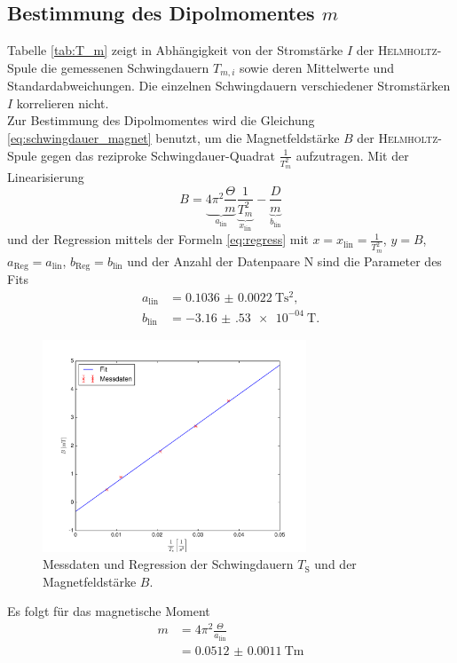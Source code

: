 \subsection{Bestimmung des Dipolmomentes \texorpdfstring{$m$}{m}}
\label{sec:auswertung2}
Tabelle \ref{tab:T_m} zeigt in Abhängigkeit von der Stromstärke $I$ der \textsc{Helmholtz}-Spule die gemessenen Schwingdauern $T_{m,i}$ sowie deren Mittelwerte und Standardabweichungen. 
Die einzelnen Schwingdauern verschiedener Stromstärken $I$ korrelieren nicht.\\

Zur Bestimmung des Dipolmomentes wird die Gleichung \eqref{eq:schwingdauer_magnet} benutzt, um die Magnetfeldstärke $B$ 
der \textsc{Helmholtz}-Spule gegen das reziproke Schwingdauer-Quadrat $\frac{1}{T_{m}^2}$ aufzutragen.
Mit der Linearisierung
\begin{equation}
	B = \underbrace{4\pi^2\frac{\Theta}{m}}_{a_\text{lin}} \underbrace{\frac{1}{T_m^2}}_{x_\text{lin}} - \underbrace{\frac{D}{m}}_{b_\text{lin}}
	\label{eq:B_lin}
\end{equation}
und der Regression mittels der Formeln \eqref{eq:regress}
mit $x=x_\text{lin}=\frac{1}{T_m^2}$, $y=B$, $a_\text{Reg}=a_\text{lin}$, $b_\text{Reg}=b_\text{lin}$ und der Anzahl der Datenpaare N sind die Parameter des Fits
\begin{align}
	a_\text{lin}&=	\SI{0.1036(22)}{\tesla\second\squared}, \\
	b_\text{lin}&=	-\SI{3.16(53)e-04}{\tesla}.
\end{align}
\begin{figure}[p]
	\centering
	\includegraphics[width=0.7\textwidth]{Bilder/Magnetfeld.pdf}
	\caption{Messdaten und Regression der Schwingdauern $T_\text{S}$ und der Magnetfeldstärke $B$.}
	\label{fig:Magnetfeld}
\end{figure}
Es folgt für das magnetische Moment
\begin{align}
	m 	&= 4\pi^2\frac{\Theta}{a_\text{lin}}\\
		&= \SI{0.0512(11)}{\tesla\meter}
	\label{eq:Magnetmoment_lin}
\end{align}
\newpage
